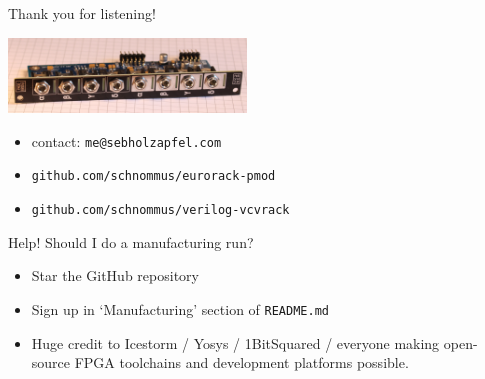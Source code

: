 \documentclass{beamer}
\begin{document}
\begin{frame}{Thank you for listening!}

    \begin{center}
        \includegraphics[height=2cm]{img/eurorack-pmod.jpg}
    \end{center}

    \begin{itemize}
        \item contact: \texttt{me@sebholzapfel.com}
        \item \texttt{github.com/schnommus/eurorack-pmod}
        \item \texttt{github.com/schnommus/verilog-vcvrack}
    \end{itemize}

    \begin{block}{Help! Should I do a manufacturing run?}
        \begin{itemize}
            \item Star the GitHub repository
            \item Sign up in `Manufacturing' section of \texttt{README.md}
        \end{itemize}
    \end{block}

    \begin{itemize}
        \item Huge credit to Icestorm / Yosys / 1BitSquared / everyone making open-source FPGA toolchains and development platforms possible.
    \end{itemize}

\end{frame}
\end{document}
